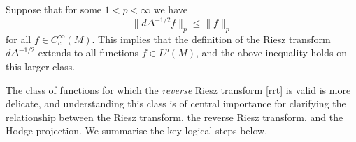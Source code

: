 \documentclass[12pt]{amsart}
\begin{document}




Suppose that for some \( 1 < p < \infty \) we have
\[
\| d \Delta^{-1/2} f \|_p \le \|f\|_p 
\]
for all \( f \in C_c^\infty(M) \). This implies that the definition of the Riesz transform \( d \Delta^{-1/2} \) extends to all functions \( f \in L^p(M) \), and the above inequality holds on this larger class.  

The class of functions for which the \emph{reverse} Riesz transform \eqref{rrt} is valid is more delicate, and understanding this class is of central importance for clarifying the relationship between the Riesz transform, the reverse Riesz transform, and the Hodge projection. We summarise the key logical steps below.
\end{document}
